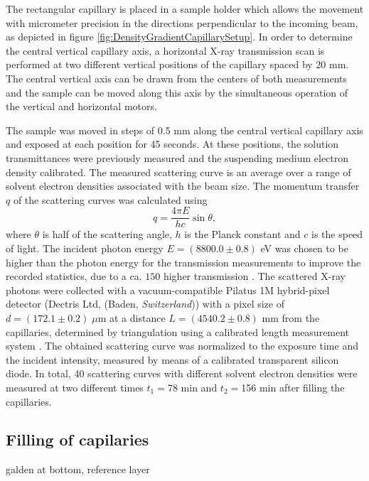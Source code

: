 The rectangular capillary is placed in a sample holder which allows the movement with micrometer precision in the directions perpendicular to the incoming beam, as depicted in figure \ref{fig:DensityGradientCapillarySetup}. In order to determine the central vertical capillary axis, a horizontal X-ray transmission scan is performed at two different vertical positions of the capillary spaced by 20 mm. The central vertical axis can be drawn from the centers of both measurements and the sample can be moved along this axis by the simultaneous operation of the vertical and horizontal motors.

The sample was moved in steps of 0.5 mm along the central vertical capillary axis and exposed at each position for 45 seconds. At these positions, the solution transmittances were previously measured and the suspending medium electron density calibrated. The measured scattering curve is an average over a range of solvent electron densities associated with the beam size. The momentum transfer \(q\) of the scattering curves was calculated using
\begin{equation}
q=\frac{4\pi E}{hc}\sin\theta ,
\end{equation}
where \(\theta\) is half of the scattering angle, \(h\) is the Planck constant and \(c\) is the speed of light. The incident photon energy \(E = \left(8800.0  \pm 0.8\right)\) eV was chosen to be higher than the photon energy for the transmission measurements to improve the recorded statistics, due to a ca. \(150\) higher transmission \cite{henke_x-ray_1993}. The scattered X-ray photons were collected with a vacuum-compatible Pilatus 1M hybrid-pixel detector (Dectris Ltd, (Baden, \emph{Switzerland})) with a pixel size of \(d = \left(172.1  \pm 0.2\right) \; \mu \)m at a distance \(L = \left(4540.2  \pm 0.8\right)\) mm from the capillaries, determined by triangulation using a calibrated length measurement system \cite{wernecke_characterization_2014}. The obtained scattering curve was normalized to the exposure time and the incident intensity, measured by means of a calibrated transparent silicon diode.  In total, 40 scattering curves with different solvent electron densities were measured at two different times \(t_1=\)78 min and \(t_2=\)156 min after filling the capillaries.


\subsection{Filling of capilaries}
galden at bottom, reference layer


